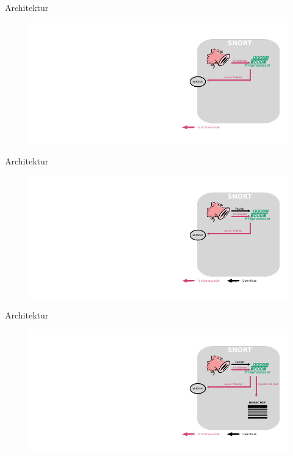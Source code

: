 \documentclass[18pt]{beamer}
\begin{document}
\begin{frame}{Architektur}
    \begin{figure}
    	\centering	
    	\includegraphics[width=\textwidth]{./images/3.pdf}
    \end{figure}
\end{frame}

\begin{frame}{Architektur}
    \begin{figure}
    	\centering
    	\includegraphics[width=\textwidth]{./images/4.pdf}
    \end{figure}
\end{frame}

\begin{frame}{Architektur}
    \begin{figure}
    	\centering
    	\includegraphics[width=\textwidth]{./images/5.pdf}
    \end{figure}
\end{frame}
\end{document}

